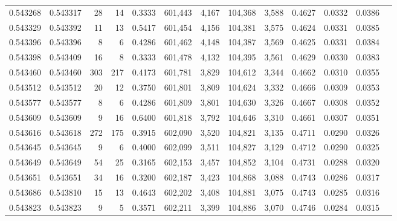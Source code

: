 \begin{tabular}{rrrrrrrrrrrrr}
0.543268 & 0.543317 &    28 &    14 &                                     0.3333 & 601,443 &   4,167 & 104,368 &   3,588 & 0.4627 & 0.0332 & 0.0386 \\
0.543329 & 0.543392 &    11 &    13 &                                     0.5417 & 601,454 &   4,156 & 104,381 &   3,575 & 0.4624 & 0.0331 & 0.0385 \\
0.543396 & 0.543396 &     8 &     6 &                                     0.4286 & 601,462 &   4,148 & 104,387 &   3,569 & 0.4625 & 0.0331 & 0.0384 \\
0.543398 & 0.543409 &    16 &     8 &                                     0.3333 & 601,478 &   4,132 & 104,395 &   3,561 & 0.4629 & 0.0330 & 0.0383 \\
0.543460 & 0.543460 &   303 &   217 &                                     0.4173 & 601,781 &   3,829 & 104,612 &   3,344 & 0.4662 & 0.0310 & 0.0355 \\
0.543512 & 0.543512 &    20 &    12 &                                     0.3750 & 601,801 &   3,809 & 104,624 &   3,332 & 0.4666 & 0.0309 & 0.0353 \\
0.543577 & 0.543577 &     8 &     6 &                                     0.4286 & 601,809 &   3,801 & 104,630 &   3,326 & 0.4667 & 0.0308 & 0.0352 \\
0.543609 & 0.543609 &     9 &    16 &                                     0.6400 & 601,818 &   3,792 & 104,646 &   3,310 & 0.4661 & 0.0307 & 0.0351 \\
0.543616 & 0.543618 &   272 &   175 &                                     0.3915 & 602,090 &   3,520 & 104,821 &   3,135 & 0.4711 & 0.0290 & 0.0326 \\
0.543645 & 0.543645 &     9 &     6 &                                     0.4000 & 602,099 &   3,511 & 104,827 &   3,129 & 0.4712 & 0.0290 & 0.0325 \\
0.543649 & 0.543649 &    54 &    25 &                                     0.3165 & 602,153 &   3,457 & 104,852 &   3,104 & 0.4731 & 0.0288 & 0.0320 \\
0.543651 & 0.543651 &    34 &    16 &                                     0.3200 & 602,187 &   3,423 & 104,868 &   3,088 & 0.4743 & 0.0286 & 0.0317 \\
0.543686 & 0.543810 &    15 &    13 &                                     0.4643 & 602,202 &   3,408 & 104,881 &   3,075 & 0.4743 & 0.0285 & 0.0316 \\
0.543823 & 0.543823 &     9 &     5 &                                     0.3571 & 602,211 &   3,399 & 104,886 &   3,070 & 0.4746 & 0.0284 & 0.0315 \\

\end{tabular}
